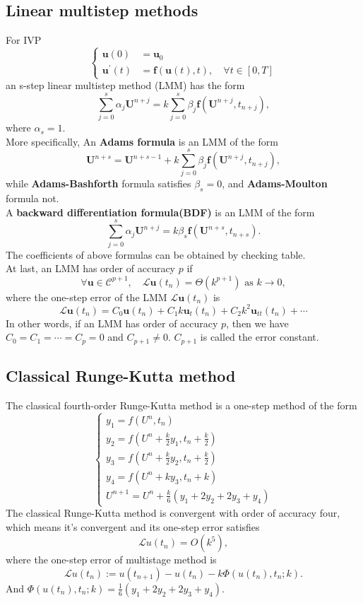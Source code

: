 \documentclass[a4paper,twocolumn]{article}
\theoremstyle{definition}
\begin{document}
\subsection{Linear multistep methods}
For IVP
$$\left\{\begin{aligned} \mathbf{u}(0) &=\mathbf{u}_{0} \\ \mathbf{u}^{\prime}(t) &=\mathbf{f}(\mathbf{u}(t), t), \quad \forall t \in[0, T] \end{aligned}\right.$$
an s-step linear multistep method (LMM) has the form
$$
\sum_{j=0}^{s} \alpha_{j} \mathbf{U}^{n+j}=k \sum_{j=0}^{s} \beta_{j} \mathbf{f}\left(\mathbf{U}^{n+j}, t_{n+j}\right),
$$
where $\alpha_s=1$.\\
More specifically, An \textbf{Adams formula} is an LMM of the form
$$
\mathbf{U}^{n+s}=\mathbf{U}^{n+s-1}+k \sum_{j=0}^{s} \beta_{j} \mathbf{f}\left(\mathbf{U}^{n+j}, t_{n+j}\right),
$$
while \textbf{Adams-Bashforth} formula satisfies $\beta_s=0$, and \textbf{Adams-Moulton} formula not.\\
A \textbf{backward differentiation formula(BDF)} is an LMM of the form
$$
\sum_{j=0}^{s} \alpha_{j} \mathbf{U}^{n+j}=k \beta_{s} \mathbf{f}\left(\mathbf{U}^{n+s}, t_{n+s}\right).
$$
The coefficients of above formulas can be obtained by checking table.\\
At last, an LMM has order of accuracy $p$ if
$$
\forall \mathbf{u} \in \mathcal{C}^{p+1}, \quad \mathcal{L} \mathbf{u}\left(t_{n}\right)=\Theta\left(k^{p+1}\right) \text { as } k \rightarrow 0,
$$
where the one-step error of the LMM $\mathcal{L}\mathbf{u}\left(t_{n}\right)$ is
$$
\mathcal{L} \mathbf{u}\left(t_{n}\right)=C_{0} \mathbf{u}\left(t_{n}\right)+C_{1} k \mathbf{u}_{t}\left(t_{n}\right)+C_{2} k^{2} \mathbf{u}_{t t}\left(t_{n}\right)+\cdots
$$
In other words, if an LMM has order of accuracy $p$, then we have $C_0 = C_1 = 
\cdots = C_p = 0$ and $C_{p+1} \ne 0$. $C_{p+1}$ is called the error constant.
\subsection{Classical Runge-Kutta method}
The classical fourth-order Runge-Kutta method is a one-step method of the form
$$
\left\{\begin{array}{l}
y_{1}=f\left(U^{n}, t_{n}\right) \\
y_{2}=f\left(U^{n}+\frac{k}{2} y_{1}, t_{n}+\frac{k}{2}\right) \\
y_{3}=f\left(U^{n}+\frac{k}{2} y_{2}, t_{n}+\frac{k}{2}\right) \\
y_{4}=f\left(U^{n}+k y_{3}, t_{n}+k\right) \\
U^{n+1}=U^{n}+\frac{k}{6}\left(y_{1}+2 y_{2}+2 y_{3}+y_{4}\right)
\end{array}\right.
$$
The classical Runge-Kutta method is convergent with order of
accuracy four, which means it's convergent and its one-step error satisfies
$$
\mathcal{L} u\left(t_{n}\right)=O\left(k^{5}\right),
$$
where the one-step error of multistage method is
$$
\mathcal{L} u\left(t_{n}\right):=u\left(t_{n+1}\right)-u\left(t_{n}\right)-k \Phi\left(u\left(t_{n}\right), t_{n} ; k\right) .
$$
And $\Phi\left(u\left(t_{n}\right), t_{n} ; k\right)=\frac{1}{6}\left(y_{1}+2 y_{2}+2 y_{3}+y_{4}\right)$.
\end{document}
